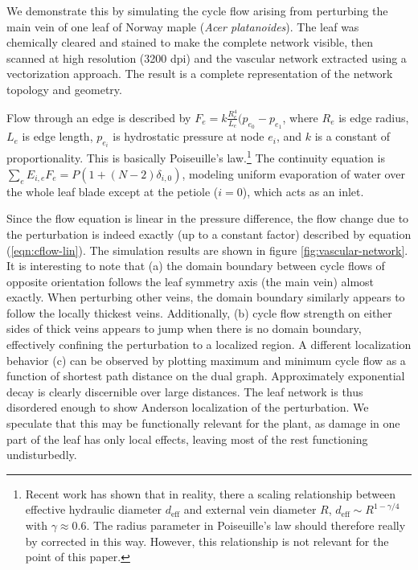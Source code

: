 \documentclass[10pt,aps,pra,twocolumn,superscriptaddress]{revtex4-1}
\begin{document}
We demonstrate this by simulating the cycle flow arising from perturbing
the main vein of one leaf of Norway maple (\emph{Acer platanoides}).
The leaf was chemically cleared and stained to make the complete network
visible, then scanned at high resolution (3200 dpi) and the vascular
network extracted using a vectorization approach. The result is a
complete representation of the network topology and geometry.

Flow through an edge is described by $F_e = k\frac{R_e^4}{L_e} (p_{e_0}
-p_{e_1}$, where $R_e$ is edge radius, $L_e$ is edge length, $p_{e_i}$
is hydrostatic pressure at node $e_i$, and $k$ is a constant of 
proportionality. This is basically Poiseuille's law.\footnote{Recent
work has shown that in reality, there a scaling relationship between
effective hydraulic diameter $d_\mathrm{eff}$ and external vein diameter
$R$, $d_\mathrm{eff} \sim R^{1-\gamma/4}$ with $\gamma \approx 0.6$.
The radius parameter in Poiseuille's law should therefore really by
corrected in this way. However, this relationship is not relevant for
the point of this paper.}
The continuity equation is $\sum_e E_{i,e} F_e = P(1 + (N-2)\delta_{i,0})$,
modeling uniform evaporation of water over the whole leaf blade 
except at the petiole ($i=0$), which acts as an inlet.

Since the flow equation is linear in the pressure difference, the
flow change due to the perturbation is indeed exactly 
(up to a constant factor) described by equation (\ref{eqn:cflow-lin}).
The simulation results are shown in figure \ref{fig:vascular-network}.
It is interesting to note that (a) the domain boundary between cycle
flows of opposite orientation follows the leaf symmetry axis (the main
vein) almost exactly. When perturbing other veins, the domain boundary
similarly appears to follow the locally thickest veins.
Additionally, (b) cycle flow strength on either sides of thick veins
appears to jump when there is no domain boundary, effectively confining
the perturbation to a localized region.
A different localization behavior (c) can be observed by plotting
maximum and minimum cycle flow as a function of shortest path distance
on the dual graph. Approximately exponential decay is clearly discernible
over large distances. The leaf network is thus disordered enough
to show Anderson localization of the perturbation.
We speculate that this may be functionally relevant for the plant,
as damage in one part of the leaf has only local effects, leaving
most of the rest functioning undisturbedly.
\end{document}
